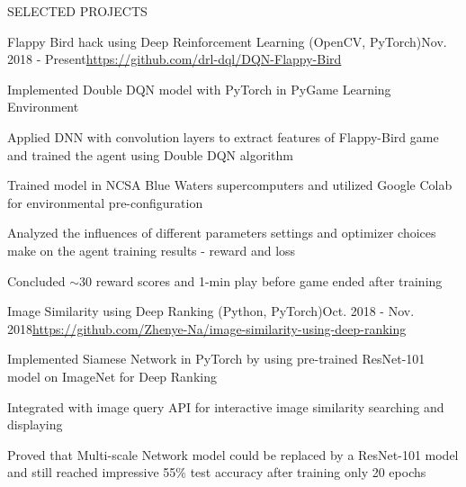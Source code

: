 \documentclass{resume} %
\begin{document}

\begin{rSection}{SELECTED PROJECTS}


\begin{rSubsection}{Flappy Bird hack using Deep Reinforcement Learning (OpenCV, PyTorch)}{Nov. 2018 - Present}{\url{https://github.com/drl-dql/DQN-Flappy-Bird}}{}
\item Implemented Double DQN model with PyTorch in PyGame Learning Environment
\item Applied DNN with convolution layers to extract features of Flappy-Bird game and trained the agent using Double DQN algorithm
\item Trained model in NCSA Blue Waters supercomputers and utilized Google Colab for environmental pre-configuration
\item Analyzed the influences of different parameters settings and optimizer choices make on the agent training results - reward and loss
\item Concluded $\sim 30$ reward scores and 1-min play before game ended after training
\end{rSubsection}



\begin{rSubsection}{Image Similarity using Deep Ranking (Python, PyTorch)}{Oct. 2018 - Nov. 2018}{\url{https://github.com/Zhenye-Na/image-similarity-using-deep-ranking}}{}
\item Implemented Siamese Network in PyTorch by using pre-trained ResNet-101 model on ImageNet for Deep Ranking
\item Integrated with image query API for interactive image similarity searching and displaying
\item Proved that Multi-scale Network model could be replaced by a ResNet-101 model and still reached impressive 55\% test accuracy after training only 20 epochs
\end{rSubsection}




\end{rSection}
\end{document}
